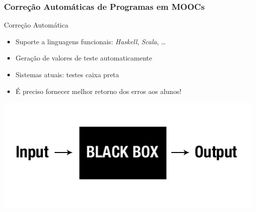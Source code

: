 \documentclass{beamer}
\begin{document}
\begin{frame}
 \frametitle{Correção Automáticas de Programas em MOOCs}

  \begin{block}{Correção Automática}
    \begin{itemize}
      \item Suporte a linguagens funcionais: \textit{Haskell}, \textit{Scala}, \ldots
      \item Geração de valores de teste automaticamente
      \item Sistemas atuais: testes caixa preta
      \item É preciso fornecer melhor retorno dos erros aos alunos!
    \end{itemize}
  \end{block}

  \begin{center}
    \includegraphics[scale=0.4]{img/blackbox.jpg}
  \end{center}

\end{frame}
\end{document}
